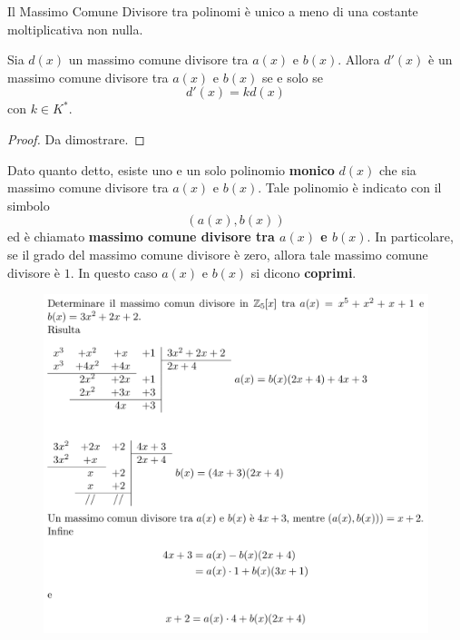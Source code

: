 \documentclass[a4paper,12pt, oneside]{book}
\begin{document}

Il Massimo Comune Divisore tra polinomi è unico a meno di una costante moltiplicativa non nulla.

\begin{teorema}
	Sia $d(x)$ un massimo comune divisore tra $a(x)$ e $b(x)$. Allora $d'(x)$ è un massimo comune divisore tra $a(x)$ e $b(x)$ se e solo se $$d'(x)=k d(x)$$ con $k \in K^{*}$.

	\begin{proof}
		Da dimostrare. %
	\end{proof}
\end{teorema}

\begin{osservazione}
	Dato quanto detto, esiste uno e un solo polinomio \textbf{monico} $d(x)$ che sia massimo comune divisore tra $a(x)$ e $b(x)$.
	Tale polinomio è indicato con il simbolo $$(a(x), b(x))$$ ed è chiamato \textbf{massimo comune divisore tra $a(x)$ e $b(x)$}.
	In particolare, se il grado del massimo comune divisore è zero, allora tale massimo comune divisore è $1$. In questo caso $a(x)$ e $b(x)$ si dicono \textbf{coprimi}.
\end{osservazione}

\begin{shaded}
	\begin{esempio}
	\end{esempio}
	\begin{figure}[H]
		\includegraphics[width=\linewidth,scale=1]{polydiv1}
	\end{figure}
\end{shaded}
\end{document}
